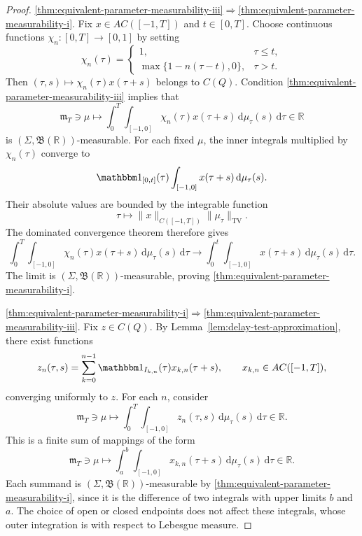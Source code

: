 \documentclass[reqno]{amsart}
\theoremstyle{plain}
\numberwithin{equation}{section}
\numberwithin{definition}{section}
\newcommand\RR{\ensuremath{\mathbb{R}}}
\newcommand{\dd}{\ensuremath{\mathrm{d}}}
\begin{document}
{\begin{proof}
\medskip
\noindent
\ref{thm:equivalent-parameter-measurability-iii}$\Rightarrow$\ref{thm:equivalent-parameter-measurability-i}.
Fix $x\in AC([-1,T])$ and $t\in[0,T]$.
Choose continuous functions $\chi_n:[0,T]\to[0,1]$
by setting
\begin{equation*}
    \chi_n(\tau)
    =
    \begin{cases}
        1,&\tau\le t,\\
        \max\{1-n(\tau-t),0\},&\tau>t.
    \end{cases}
\end{equation*}
Then $(\tau,s)\mapsto\chi_n(\tau)x(\tau+s)$ belongs to $C(Q)$. Condition \ref{thm:equivalent-parameter-measurability-iii} implies that
\begin{equation*}
    \mathfrak{m}_T\ni \mu\mapsto
    \int_0^T\int_{[-1,0]}
    \chi_n(\tau)x(\tau+s)\,
    \dd\mu_\tau(s)\,\dd\tau \in \RR
\end{equation*}
is $(\Sigma,\mathfrak B(\mathbb R))$-measurable. For each fixed $\mu$, the inner integrals multiplied
by $\chi_n(\tau)$ converge to
\begin{equation*}
    \mathbbm 1_{[0,t]}(\tau)
    \int_{[-1,0]}x(\tau+s)\,\dd\mu_\tau(s).
\end{equation*}
Their absolute values are bounded by the integrable
function
\begin{equation*}
    \tau\mapsto \|x\|_{C([-1,T])}\|\mu_\tau\|_{\mathrm{TV}}. 
\end{equation*}
The dominated convergence theorem therefore gives
\begin{equation*}
    \int_0^T\int_{[-1,0]}
    \chi_n(\tau)x(\tau+s)\,
    \dd\mu_\tau(s)\,\dd\tau
    \to
    \int_0^t\int_{[-1,0]}
    x(\tau+s)\,\dd\mu_\tau(s)\,\dd\tau.
\end{equation*}
The limit is $(\Sigma,\mathfrak B(\mathbb R))$-measurable, proving \ref{thm:equivalent-parameter-measurability-i}.

\medskip
\noindent
\ref{thm:equivalent-parameter-measurability-i}$\Rightarrow$\ref{thm:equivalent-parameter-measurability-iii}.
Fix $z\in C(Q)$.
By Lemma~\ref{lem:delay-test-approximation}, there exist
functions
\begin{equation*}
    z_n(\tau,s)
    =
    \sum_{k=0}^{n-1}
    \mathbbm 1_{I_{k,n}}(\tau)x_{k,n}(\tau+s),
    \qquad x_{k,n}\in AC([-1,T]),
\end{equation*}
converging uniformly to $z$. For each $n$, consider
\begin{equation*}
     \mathfrak{m}_T\ni \mu\mapsto
    \int_0^T\int_{[-1,0]}
    z_n(\tau,s)\,\dd\mu_\tau(s)\,\dd\tau \in \RR.
\end{equation*}
This is a finite sum of mappings of the form
\begin{equation*}
     \mathfrak{m}_T\ni \mu\mapsto
    \int_a^b\int_{[-1,0]}
    x_{k,n}(\tau+s)\,\dd\mu_\tau(s)\,\dd\tau\in \RR.
\end{equation*}
Each summand is $(\Sigma,\mathfrak B(\RR))$-measurable by \ref{thm:equivalent-parameter-measurability-i}, since it
is the difference of two integrals with upper limits
$b$ and $a$. The choice of open or closed endpoints
does not affect these integrals, whose outer integration
is with respect to Lebesgue measure.


\end{proof}}
\end{document}
